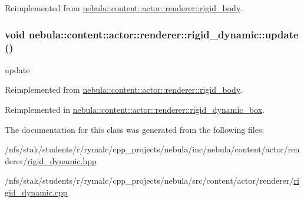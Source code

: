 Reimplemented from \hyperlink{classnebula_1_1content_1_1actor_1_1renderer_1_1rigid__body_a5e76495c7870d3b88c5b32888f9fa504}{nebula::content::actor::renderer::rigid\_\-body}.\hypertarget{classnebula_1_1content_1_1actor_1_1renderer_1_1rigid__dynamic_a53122ec3edecc185ebe31a8bb38be920}{
\subsubsection[{update}]{\setlength{\rightskip}{0pt plus 5cm}void nebula::content::actor::renderer::rigid\_\-dynamic::update ()}}
\label{classnebula_1_1content_1_1actor_1_1renderer_1_1rigid__dynamic_a53122ec3edecc185ebe31a8bb38be920}


update 

Reimplemented from \hyperlink{classnebula_1_1content_1_1actor_1_1renderer_1_1rigid__body_a11f37d90346888f7dc70cae54954a584}{nebula::content::actor::renderer::rigid\_\-body}.

Reimplemented in \hyperlink{classnebula_1_1content_1_1actor_1_1renderer_1_1rigid__dynamic__box_af93072ba126df030c9eb4ec7d2898104}{nebula::content::actor::renderer::rigid\_\-dynamic\_\-box}.

The documentation for this class was generated from the following files:\begin{DoxyCompactItemize}
\item 
/nfs/stak/students/r/rymalc/cpp\_\-projects/nebula/inc/nebula/content/actor/renderer/\hyperlink{renderer_2rigid__dynamic_8hpp}{rigid\_\-dynamic.hpp}\item 
/nfs/stak/students/r/rymalc/cpp\_\-projects/nebula/src/content/actor/renderer/\hyperlink{renderer_2rigid__dynamic_8cpp}{rigid\_\-dynamic.cpp}\end{DoxyCompactItemize}
